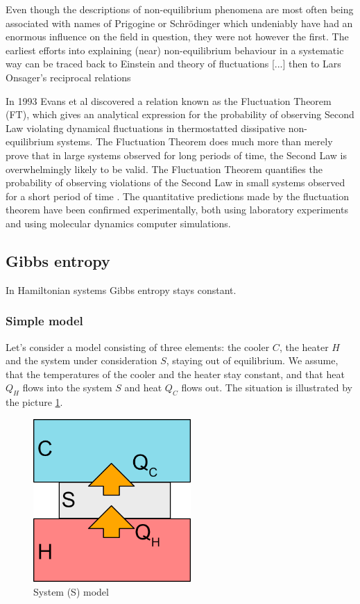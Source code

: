 \documentclass[a4paper,12pt,nofootinbib]{article}
\begin{document}
Even though the descriptions of non-equilibrium phenomena are most often being associated with names of Prigogine or Schr{\" o}dinger which undeniably have had an enormous influence on the field in question, they were not however the first.
The earliest efforts into explaining (near) non-equilibrium behaviour in a systematic way can be traced back to Einstein and theory of fluctuations [...] then to Lars Onsager's reciprocal relations


In 1993 Evans et al discovered a relation known as the Fluctuation Theorem (FT), which gives an analytical expression for the probability of observing Second Law violating dynamical fluctuations in thermostatted dissipative non-equilibrium systems.
The Fluctuation Theorem does much more than merely prove that in large systems observed for long periods of time, the Second Law is overwhelmingly likely to be valid. The Fluctuation Theorem quantifies the probability of observing violations of the Second Law in small systems observed for a short period of time \cite{Evans:2002gy}. The quantitative predictions made by the fluctuation theorem have been confirmed experimentally, both using laboratory experiments and using molecular dynamics computer simulations.

\subsection{Gibbs entropy}

In Hamiltonian systems Gibbs entropy stays constant.

\subsubsection{Simple model}
Let's consider a model consisting of three elements: the cooler $C$, the heater $H$ and the system under consideration $S$, staying out of equilibrium.
We assume, that the temperatures of the cooler and the heater stay constant, and that heat $Q_H$ flows into the system $S$ and heat $Q_C$ flows out. The situation is illustrated by the picture \ref{Fig2}.
\begin{figure}[ht!]
\centering \includegraphics[width=6cm]{system} \caption{System (S) model}
\label{Fig2} 
\end{figure}
\end{document}
